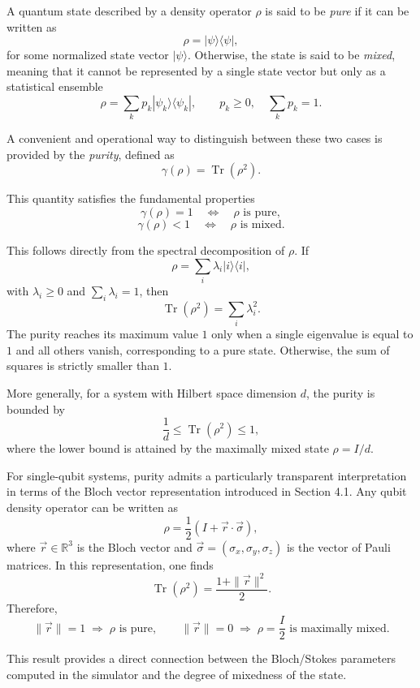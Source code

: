 \documentclass[a4paper]{article}
\begin{document}
A quantum state described by a density operator $\rho$ is said to be \emph{pure} if it can be written as
\[
\rho = |\psi\rangle \langle \psi|,
\]
for some normalized state vector $|\psi\rangle$. Otherwise, the state is said to be \emph{mixed}, meaning that it cannot be represented by a single state vector but only as a statistical ensemble
\[
\rho = \sum_k p_k |\psi_k\rangle \langle \psi_k|, \qquad p_k \ge 0, \quad \sum_k p_k = 1.
\]

A convenient and operational way to distinguish between these two cases is provided by the \emph{purity}, defined as
\[
\gamma(\rho) = \operatorname{Tr}(\rho^2).
\]

This quantity satisfies the fundamental properties
\[
\gamma(\rho) = 1 \quad \Longleftrightarrow \quad \rho \text{ is pure},
\]
\[
\gamma(\rho) < 1 \quad \Longleftrightarrow \quad \rho \text{ is mixed}.
\]

This follows directly from the spectral decomposition of $\rho$. If
\[
\rho = \sum_i \lambda_i |i\rangle \langle i|,
\]
with $\lambda_i \ge 0$ and $\sum_i \lambda_i = 1$, then
\[
\operatorname{Tr}(\rho^2) = \sum_i \lambda_i^2.
\]
The purity reaches its maximum value $1$ only when a single eigenvalue is equal to $1$ and all others vanish, corresponding to a pure state. Otherwise, the sum of squares is strictly smaller than $1$.

More generally, for a system with Hilbert space dimension $d$, the purity is bounded by
\[
\frac{1}{d} \le \operatorname{Tr}(\rho^2) \le 1,
\]
where the lower bound is attained by the maximally mixed state $\rho = I/d$.

\medskip

For single-qubit systems, purity admits a particularly transparent interpretation in terms of the Bloch vector representation introduced in Section 4.1. Any qubit density operator can be written as
\[
\rho = \frac{1}{2}\left(I + \vec{r} \cdot \vec{\sigma}\right),
\]
where $\vec{r} \in \mathbb{R}^3$ is the Bloch vector and $\vec{\sigma} = (\sigma_x, \sigma_y, \sigma_z)$ is the vector of Pauli matrices. In this representation, one finds
\[
\operatorname{Tr}(\rho^2) = \frac{1 + \|\vec{r}\|^2}{2}.
\]
Therefore,
\[
\|\vec{r}\| = 1 \;\Rightarrow\; \rho \text{ is pure},
\qquad
\|\vec{r}\| = 0 \;\Rightarrow\; \rho = \frac{I}{2} \text{ is maximally mixed}.
\]

This result provides a direct connection between the Bloch/Stokes parameters computed in the simulator and the degree of mixedness of the state.
\end{document}
